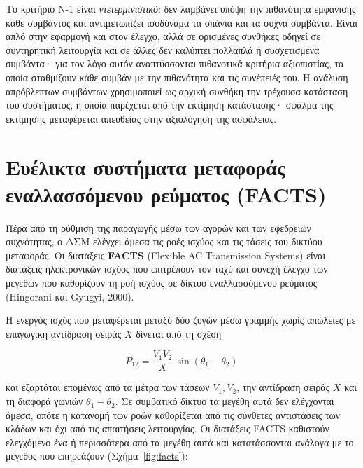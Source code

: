 Το κριτήριο N-1 είναι \emph{ντετερμινιστικό}: δεν λαμβάνει υπόψη την πιθανότητα εμφάνισης
κάθε συμβάντος και αντιμετωπίζει ισοδύναμα τα σπάνια και τα συχνά συμβάντα. Είναι απλό στην
εφαρμογή και στον έλεγχο, αλλά σε ορισμένες συνθήκες οδηγεί σε συντηρητική λειτουργία και σε
άλλες δεν καλύπτει πολλαπλά ή συσχετισμένα συμβάντα· για τον λόγο αυτόν αναπτύσσονται
πιθανοτικά κριτήρια αξιοπιστίας, τα οποία σταθμίζουν κάθε συμβάν με την πιθανότητα και τις
συνέπειές του. Η ανάλυση απρόβλεπτων συμβάντων χρησιμοποιεί ως αρχική συνθήκη την τρέχουσα
κατάσταση του συστήματος, η οποία παρέχεται από την εκτίμηση κατάστασης· σφάλμα της
εκτίμησης μεταφέρεται απευθείας στην αξιολόγηση της ασφάλειας.

\section{Ευέλικτα συστήματα μεταφοράς εναλλασσόμενου ρεύματος (FACTS)}

Πέρα από τη ρύθμιση της παραγωγής μέσω των αγορών και των εφεδρειών συχνότητας, ο ΔΣΜ
ελέγχει άμεσα τις ροές ισχύος και τις τάσεις του δικτύου μεταφοράς. Οι διατάξεις
\textbf{FACTS} (Flexible AC Transmission Systems) είναι διατάξεις ηλεκτρονικών ισχύος που
επιτρέπουν τον ταχύ και συνεχή έλεγχο των μεγεθών που καθορίζουν τη ροή ισχύος σε δίκτυο
εναλλασσόμενου ρεύματος (Hingorani και Gyugyi, 2000).

Η ενεργός ισχύς που μεταφέρεται μεταξύ δύο ζυγών μέσω γραμμής χωρίς απώλειες με επαγωγική
αντίδραση σειράς $X$ δίνεται από τη σχέση

\begin{equation}
P_{12} = \frac{V_1 V_2}{X}\,\sin(\theta_1 - \theta_2)
\label{eq:powerflow}
\end{equation}

και εξαρτάται επομένως από τα μέτρα των τάσεων $V_1, V_2$, την αντίδραση σειράς $X$ και τη
διαφορά γωνιών $\theta_1 - \theta_2$. Σε
συμβατικό δίκτυο τα μεγέθη αυτά δεν ελέγχονται άμεσα, οπότε η κατανομή των ροών καθορίζεται
από τις σύνθετες αντιστάσεις των κλάδων και όχι από τις απαιτήσεις λειτουργίας. Οι διατάξεις
FACTS καθιστούν ελεγχόμενο ένα ή περισσότερα από τα μεγέθη αυτά και κατατάσσονται ανάλογα με
το μέγεθος που επηρεάζουν (Σχήμα~\ref{fig:facts}):

